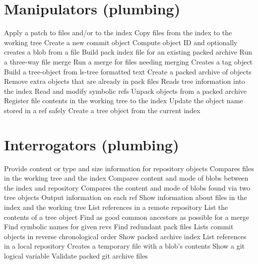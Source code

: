 \section{Manipulators (plumbing)}
	{Apply a patch to files and/or to the index}
	{Copy files from the index to the working tree}
	{Create a new commit object}
	{Compute object ID and optionally creates a blob from a file}
	{Build pack index file for an existing packed archive}
	{Run a three-way file merge}
	{Run a merge for files needing merging}
	{Creates a tag object}
	{Build a tree-object from ls-tree formatted text}
	{Create a packed archive of objects}
	{Remove extra objects that are already in pack files}
	{Reads tree information into the index}
	{Read and modify symbolic refs}
	{Unpack objects from a packed archive}
	{Register file contents in the working tree to the index}
	{Update the object name stored in a ref safely}
	{Create a tree object from the current index}

\section{Interrogators (plumbing)}
	{Provide content or type and size information for repository objects}
	{Compares files in the working tree and the index}
	{Compares content and mode of blobs between the index and repository}
	{\emergencystretch=5pt Compares the content and mode of blobs found via two tree objects}
	{Output information on each ref}
	{Show information about files in the index and the working tree}
	{List references in a remote repository}
	{List the contents of a tree object}
	{Find as good common ancestors as possible for a merge}
	{Find symbolic names for given revs}
	{Find redundant pack files}
	{Lists commit objects in reverse chronological order}
	{Show packed archive index}
	{List references in a local repository}
	{Creates a temporary file with a blob’s contents}
	{Show a git logical variable}
	{Validate packed git archive files}

